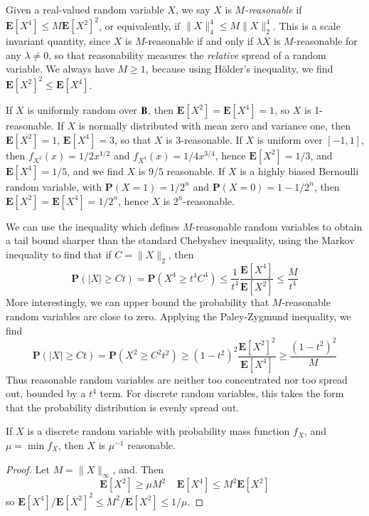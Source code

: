 Given a real-valued random variable $X$, we say $X$ is \emph{$M$-reasonable} if $\mathbf{E}[X^4] \leq M \mathbf{E}[X^2]^2$, or equivalently, if $\| X \|_4^4 \leq M \| X \|_2^4$. This is a scale invariant quantity, since $X$ is $M$-reasonable if and only if $\lambda X$ is $M$-reasonable for any $\lambda \neq 0$, so that reasonability measures the {\it relative} spread of a random variable. We always have $M \geq 1$, because using H\"{o}lder's inequality, we find $\mathbf{E}[X^2]^2 \leq \mathbf{E}[X^4]$.

\begin{example}
    If $X$ is uniformly random over $\operatorname{\mathbf{B}}$, then $\mathbf{E}[X^2] = \mathbf{E}[X^4] = 1$, so $X$ is 1-reasonable. If $X$ is normally distributed with mean zero and variance one, then $\mathbf{E}[X^2] = 1$, $\mathbf{E}[X^4] = 3$, so that $X$ is 3-reasonable. If $X$ is uniform over $[-1,1]$, then $f_{X^2}(x) = 1/2x^{1/2}$ and $f_{X^4}(x) = 1/4x^{3/4}$, hence $\mathbf{E}[X^2] = 1/3$, and $\mathbf{E}[X^4] = 1/5$, and we find $X$ is $9/5$ reasonable. If $X$ is a highly biased Bernoulli random variable, with $\mathbf{P}(X = 1) = 1/2^n$ and $\mathbf{P}(X = 0) = 1 - 1/2^n$, then $\mathbf{E}[X^2] = \mathbf{E}[X^4] = 1/2^n$, hence $X$ is $2^n$-reasonable.
\end{example}

We can use the inequality which defines $M$-reasonable random variables to obtain a tail bound sharper than the standard Chebyshev inequality, using the Markov inequality to find that if $C = \| X \|_2$, then
%
\[ \mathbf{P}(|X| \geq Ct) = \mathbf{P}(X^4 \geq t^4 C^4) \leq \frac{1}{t^4} \frac{\mathbf{E}[X^4]}{\mathbf{E}[X^2]} \leq \frac{M}{t^4} \]
%
More interestingly, we can upper bound the probability that $M$-reasonable random variables are close to zero. Applying the Paley-Zygmund inequality, we find
%
\[ \mathbf{P}(|X| \geq Ct) = \mathbf{P}(X^2 \geq C^2t^2) \geq (1 - t^2)^2 \frac{\mathbf{E}[X^2]^2}{\mathbf{E}[X^4]} \geq \frac{(1 - t^2)^2}{M} \]
%
Thus reasonable random variables are neither too concentrated nor too spread out, bounded by a $t^4$ term. For discrete random variables, this takes the form that the probability distribution is evenly spread out.

\begin{theorem}
    If $X$ is a discrete random variable with probability mass function $f_X$, and $\mu = \min f_X$, then $X$ is $\mu^{-1}$ reasonable.
\end{theorem}
\begin{proof}
    Let $M = \| X \|_\infty$, and. Then
    \[ \mathbf{E}[X^2] \geq \mu M^2 \ \ \ \ \ \mathbf{E}[X^4] \leq M^2 \mathbf{E}[X^2] \]
    so $\mathbf{E}[X^4]/\mathbf{E}[X^2]^2 \leq M^2/\mathbf{E}[X^2] \leq 1/\mu$.
\end{proof}

